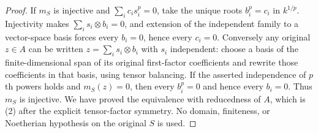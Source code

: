 \begin{proof}
If $m_S$ is injective and
$\sum_i c_i s_i^p=0$, take the unique roots
$b_i^p=c_i$ in $k^{1/p}$. Injectivity makes
$\sum_i s_i\otimes b_i=0$, and extension of the
independent family to a vector-space basis
forces every $b_i=0$, hence every $c_i=0$.
Conversely any original $z\in A$ can be written
$z=\sum_i s_i\otimes b_i$ with $s_i$ independent:
choose a basis of the finite-dimensional span
of its original first-factor coefficients and
rewrite those coefficients in that basis,
using tensor balancing. If the asserted
independence of $p$th powers holds and $m_S(z)=0$,
then every $b_i^p=0$ and hence every $b_i=0$.
Thus $m_S$ is injective. We have proved the
equivalence with reducedness of $A$, which is
(2) after the explicit tensor-factor symmetry.
No domain, finiteness, or Noetherian hypothesis
on the original $S$ is used.
\end{proof}